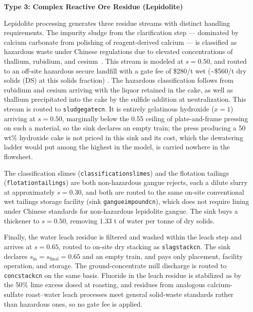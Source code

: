 \documentclass{article}
\renewcommand\_{\textunderscore\allowbreak}
\begin{document}
\medskip
\noindent\textbf{Type 3: Complex Reactive Ore Residue (Lepidolite)}\quad

Lepidolite processing generates three residue streams with distinct handling requirements. The impurity sludge from the clarification step --- dominated by calcium carbonate from polishing of reagent-derived calcium --- is classified as hazardous waste under Chinese regulations due to elevated concentrations of thallium, rubidium, and cesium~\cite{sulcaLithiumPricesWhere2024, fisherScrutinisingLithiumTechnology2022}. This stream is modeled at $s=0.50$, and routed to an off-site hazardous secure landfill with a gate fee of \$280/t wet (\textasciitilde\$560/t dry solids (DS) at this solids fraction) \cite{nationaldevelopmentandreformcommission2024}. The hazardous classification follows from rubidium and cesium arriving with the liquor retained in the cake, as well as thallium precipitated into the cake by the sulfide addition at neutralization. This stream is routed to \texttt{sludge\_gate\_cn\_50}. It is entirely gelatinous hydroxide ($x = 1$) arriving at $s = 0.50$, marginally below the 0.55 ceiling of plate-and-frame pressing on such a material, so the sink declares an empty train; the press producing a 50 wt\% hydroxide cake is not priced in this sink and its cost, which the dewatering ladder would put among the highest in the model, is carried nowhere in the flowsheet.

The classification slimes (\texttt{classification\_slimes}) and the flotation tailings (\texttt{flotation\_tailings}) are both non-hazardous gangue rejects, each a dilute slurry at approximately $s = 0.30$, and both are routed to the same on-site conventional wet tailings storage facility (sink \texttt{gangue\_impound\_cn\_30}), which does not require lining under Chinese standards for non-hazardous lepidolite gangue. The sink buys a thickener to $s = 0.50$, removing 1.33 t of water per tonne of dry solids.

Finally, the water leach residue is filtered and washed within the leach step and arrives at $s = 0.65$, routed to on-site dry stacking as \texttt{slag\_stack\_cn\_65}. The sink declares $s_\text{in} = s_\text{final} = 0.65$ and an empty train, and pays only placement, facility operation, and storage. The ground-concentrate mill discharge is routed to \texttt{conc\_stack\_cn\_60} on the same basis. Fluoride in the leach residue is stabilized as  by the 50\% lime excess dosed at roasting, and residues from analogous calcium-sulfate roast--water leach processes meet general solid-waste standards rather than hazardous ones, so no gate fee is applied.
\end{document}
